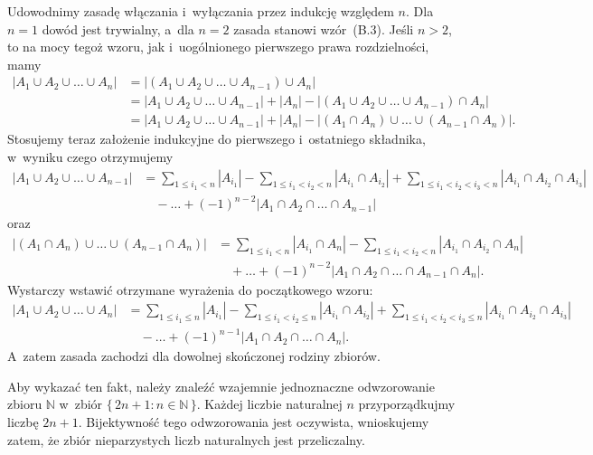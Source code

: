 \exercise %
Udowodnimy zasadę włączania i~wyłączania przez indukcję względem $n$.
Dla $n=1$ dowód jest trywialny, a~dla $n=2$ zasada stanowi wzór~(B.3).
Jeśli $n>2$, to na mocy tegoż wzoru, jak i~uogólnionego pierwszego prawa rozdzielności, mamy
\begin{align*}
    |A_1\cup A_2\cup\dots\cup A_n| &= \bigl|(A_1\cup A_2\cup\dots\cup A_{n-1})\cup A_n\bigr| \\
	&= |A_1\cup A_2\cup\dots\cup A_{n-1}|+|A_n|-\bigl|(A_1\cup A_2\cup\dots\cup A_{n-1})\cap A_n\bigr| \\
	&= |A_1\cup A_2\cup\dots\cup A_{n-1}|+|A_n|-\bigl|(A_1\cap A_n)\cup\dots\cup(A_{n-1}\cap A_n)\bigr|.
\end{align*}
Stosujemy teraz założenie indukcyjne do pierwszego i~ostatniego składnika, w~wyniku czego otrzymujemy
\begin{align*}
	|A_1\cup A_2\cup\dots\cup A_{n-1}| &= \sum_{1\le i_1<n}|A_{i_1}|-\sum_{1\le i_1<i_2<n}|A_{i_1}\cap A_{i_2}|+\sum_{1\le i_1<i_2<i_3<n}|A_{i_1}\cap A_{i_2}\cap A_{i_3}| \\[1mm]
	&\quad {}-\dots+(-1)^{n-2}|A_1\cap A_2\cap\dots\cap A_{n-1}|
\end{align*}
oraz
\begin{align*}
	\bigl|(A_1\cap A_n)\cup\dots\cup(A_{n-1}\cap A_n)\bigr| &= \sum_{1\le i_1<n}|A_{i_1}\cap A_n|-\sum_{1\le i_1<i_2<n}|A_{i_1}\cap A_{i_2}\cap A_n|\\[1mm]
	&\quad {}+\dots+(-1)^{n-2}|A_1\cap A_2\cap\dots\cap A_{n-1}\cap A_n|.
\end{align*}
Wystarczy wstawić otrzymane wyrażenia do początkowego wzoru:
\begin{align*}
	|A_1\cup A_2\cup\dots\cup A_n| &= \sum_{1\le i_1\le n}|A_{i_1}|-\sum_{1\le i_1<i_2\le n}|A_{i_1}\cap A_{i_2}|+\sum_{1\le i_1<i_2<i_3\le n}|A_{i_1}\cap A_{i_2}\cap A_{i_3}| \\[1mm]
	&\quad {}-\dots+(-1)^{n-1}|A_1\cap A_2\cap\dots\cap A_n|.
\end{align*}
A~zatem zasada zachodzi dla dowolnej skończonej rodziny zbiorów.

\exercise %

\noindent Aby wykazać ten fakt, należy znaleźć wzajemnie jednoznaczne odwzorowanie zbioru $\mathbb{N}$ w~zbiór $\bigl\{\,2n+1:n\in\mathbb{N}\,\bigr\}$.
Każdej liczbie naturalnej $n$ przyporządkujmy liczbę $2n+1$.
Bijektywność tego odwzorowania jest oczywista, wnioskujemy zatem, że zbiór nieparzystych liczb naturalnych jest przeliczalny.

